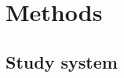 \documentclass{article}[11pt]
\begin{document}



\section*{Methods}
\subsection{Study system}
\end{document}
